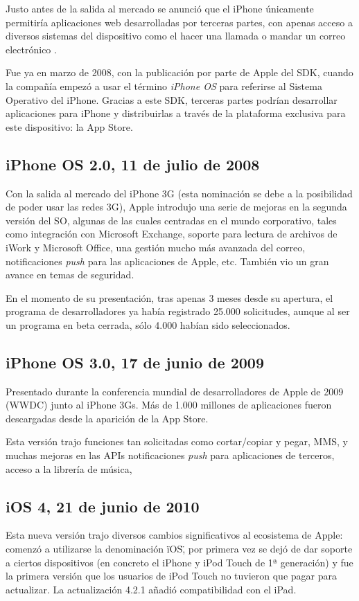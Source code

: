 Justo antes de la salida al mercado se anunció que el iPhone únicamente permitiría aplicaciones web desarrolladas por terceras partes, con apenas acceso a diversos sistemas del dispositivo como el hacer una llamada o mandar un correo electrónico \cite{iPhoneWebApps}.

Fue ya en marzo de 2008, con la publicación por parte de Apple del SDK, cuando la compañía empezó a usar el término \emph{iPhone OS} para referirse al Sistema Operativo del iPhone. Gracias a este SDK, terceras partes podrían desarrollar aplicaciones para iPhone y distribuirlas a través de la plataforma exclusiva para este dispositivo: la App Store.

\subsection{iPhone OS 2.0, 11 de julio de 2008}
Con la salida al mercado del iPhone 3G (esta nominación se debe a la posibilidad de poder usar las redes 3G), Apple introdujo una serie de mejoras en la segunda versión del SO, algunas de las cuales centradas en el mundo corporativo, tales como integración con Microsoft Exchange, soporte para lectura de archivos de iWork y Microsoft Office, una gestión mucho más avanzada del correo, notificaciones \emph{push} para las aplicaciones de Apple, etc. También vio un gran avance en temas de seguridad.

En el momento de su presentación, tras apenas 3 meses desde su apertura, el programa de desarrolladores ya había registrado 25.000 solicitudes, aunque al ser un programa en beta cerrada, sólo 4.000 habían sido seleccionados.

\subsection{iPhone OS 3.0, 17 de junio de 2009}
Presentado durante la conferencia mundial de desarrolladores de Apple de 2009 (WWDC) junto al iPhone 3Gs. Más de 1.000 millones de aplicaciones fueron descargadas desde la aparición de la App Store.

Esta versión trajo funciones tan solicitadas como cortar/copiar y pegar, MMS, y muchas mejoras en las APIs notificaciones \emph{push} para aplicaciones de terceros, acceso a la librería de música, 

\subsection{iOS 4, 21 de junio de 2010}
Esta nueva versión trajo diversos cambios significativos al ecosistema de Apple: comenzó a utilizarse la denominación \"iOS\", por primera vez se dejó de dar soporte a ciertos dispositivos (en concreto el iPhone y iPod Touch de 1ª generación) y fue la primera versión que los usuarios de iPod Touch no tuvieron que pagar para actualizar. La actualización 4.2.1 añadió compatibilidad con el iPad.

